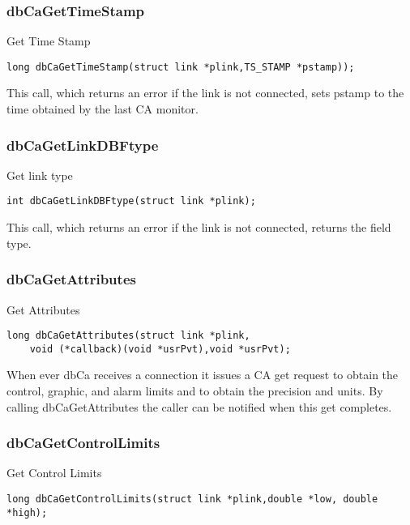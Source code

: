 \subsubsection{dbCaGetTimeStamp}

Get Time Stamp

\begin{verbatim}
long dbCaGetTimeStamp(struct link *plink,TS_STAMP *pstamp));
\end{verbatim}

This call, which returns an error if the link is not connected, sets pstamp to the time obtained by the last CA monitor.

\subsubsection{dbCaGetLinkDBFtype}

Get link type

\begin{verbatim}
int dbCaGetLinkDBFtype(struct link *plink);
\end{verbatim}

This call, which returns an error if the link is not connected, returns the field type.

\subsubsection{dbCaGetAttributes}

Get Attributes

\begin{verbatim}
long dbCaGetAttributes(struct link *plink,
    void (*callback)(void *usrPvt),void *usrPvt);
\end{verbatim}

When ever dbCa receives a connection it issues a CA get request to obtain the control, graphic, and alarm limits and to obtain the precision and units.
By calling dbCaGetAttributes the caller can be notified when this get completes.

\subsubsection{dbCaGetControlLimits}

Get Control Limits

\begin{verbatim}
long dbCaGetControlLimits(struct link *plink,double *low, double *high);
\end{verbatim}

